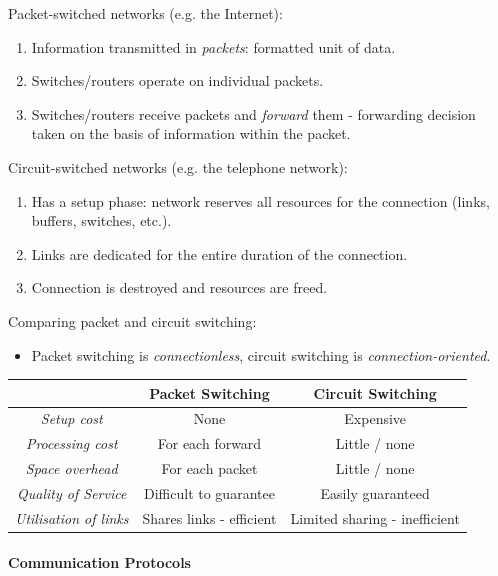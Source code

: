 \documentclass[twocolumn,english]{article}
\providecommand{\tabularnewline}{\\}
\providecommand{\tabularnewline}{\\}
\begin{document}
Packet-switched networks (e.g. the Internet):
\begin{enumerate}
\item Information transmitted in \emph{packets}: formatted unit of data.
\item Switches/routers operate on individual packets.
\item Switches/routers receive packets and \emph{forward} them - forwarding
decision taken on the basis of information within the packet.
\end{enumerate}
Circuit-switched networks (e.g. the telephone network):
\begin{enumerate}
\item Has a setup phase: network reserves all resources for the connection
(links, buffers, switches, etc.).
\item Links are dedicated for the entire duration of the connection.
\item Connection is destroyed and resources are freed.
\end{enumerate}
Comparing packet and circuit switching:
\begin{itemize}
\item Packet switching is \emph{connectionless}, circuit switching is \emph{connection-oriented}.
\end{itemize}
\begin{table}[H]
\centering{}%
\begin{tabular}{ccc}
\toprule 
 & \textbf{\footnotesize{}Packet Switching} & \textbf{\footnotesize{}Circuit Switching}\tabularnewline
\midrule
\emph{\footnotesize{}Setup cost} & {\footnotesize{}None} & {\footnotesize{}Expensive}\tabularnewline
\emph{\footnotesize{}Processing cost} & {\footnotesize{}For each forward} & {\footnotesize{}Little / none}\tabularnewline
\emph{\footnotesize{}Space overhead} & {\footnotesize{}For each packet} & {\footnotesize{}Little / none}\tabularnewline
\emph{\footnotesize{}Quality of Service} & {\footnotesize{}Difficult to guarantee} & {\footnotesize{}Easily guaranteed}\tabularnewline
\emph{\footnotesize{}Utilisation of links} & {\footnotesize{}Shares links - efficient} & {\footnotesize{}Limited sharing - inefficient}\tabularnewline
\bottomrule
\end{tabular}
\end{table}

\paragraph{Communication Protocols}
\end{document}
